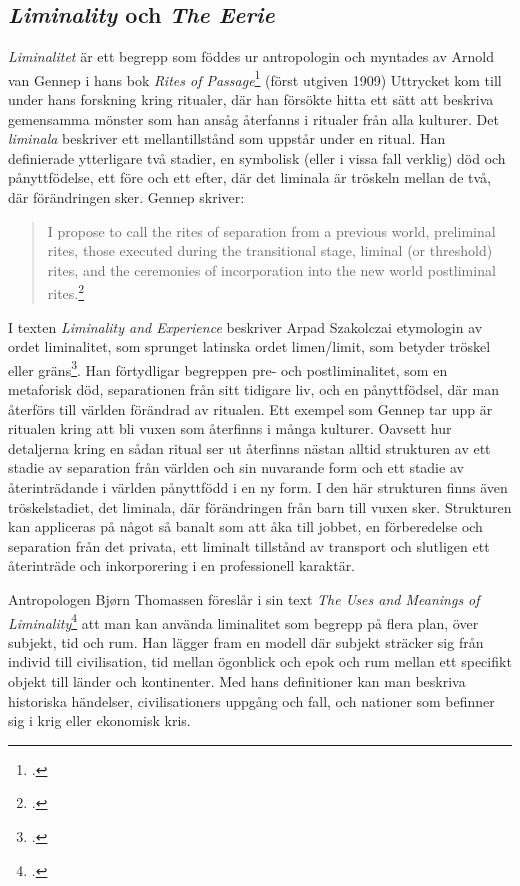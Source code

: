\documentclass{article}
\begin{document}
\subsection{\emph{Liminality} och \emph{The Eerie}}
\emph{Liminalitet} är ett begrepp som föddes ur antropologin och myntades av Arnold van Gennep i hans bok
\emph{Rites of Passage}\footcite{Gennep} (först utgiven 1909) Uttrycket kom till under hans forskning kring
ritualer, där han försökte hitta ett sätt att beskriva gemensamma mönster som han ansåg återfanns i ritualer
från alla kulturer. Det \emph{liminala} beskriver ett mellantillstånd som uppstår under en ritual. Han
definierade ytterligare två stadier, en symbolisk (eller i vissa fall verklig) död och pånyttfödelse, ett före
och ett efter, där det liminala är tröskeln mellan de två, där förändringen sker. Gennep skriver:

\begin{quote}
I propose to call the rites of separation from a previous world, preliminal rites, those executed during the
transitional stage, liminal (or threshold) rites, and the ceremonies of incorporation into the new world
postliminal rites.\footcite[21]{Gennep}
\end{quote}

I texten \emph{Liminality and Experience} beskriver Arpad Szakolczai etymologin av ordet liminalitet, som
sprunget latinska ordet limen/limit, som betyder tröskel eller gräns\footcite[147-148]{Arpad}. Han förtydligar
begreppen pre- och postliminalitet, som en metaforisk död, separationen från sitt tidigare liv, och en
pånyttfödsel, där man återförs till världen förändrad av ritualen. Ett exempel som Gennep tar upp är ritualen
kring att bli vuxen som återfinns i många kulturer. Oavsett hur detaljerna kring en sådan ritual ser ut
återfinns nästan alltid strukturen av ett stadie av separation från världen och sin nuvarande form och ett
stadie av återinträdande i världen pånyttfödd i en ny form. I den här strukturen finns även tröskelstadiet,
det liminala, där förändringen från barn till vuxen sker. Strukturen kan appliceras på något så banalt som att
åka till jobbet, en förberedelse och separation från det privata, ett liminalt tillstånd av transport och
slutligen ett återinträde och inkorporering i en professionell karaktär.

Antropologen Bjørn Thomassen föreslår i sin text \emph{The Uses and Meanings of
Liminality}\footcite[12-13]{Thomassen} att man kan använda liminalitet som begrepp på flera plan, över
subjekt, tid och rum. Han lägger fram en modell där subjekt sträcker sig från individ till civilisation, tid
mellan ögonblick och epok och rum mellan ett specifikt objekt till länder och kontinenter. Med hans
definitioner kan man beskriva historiska händelser, civilisationers uppgång och fall, och nationer som
befinner sig i krig eller ekonomisk kris.
\end{document}
